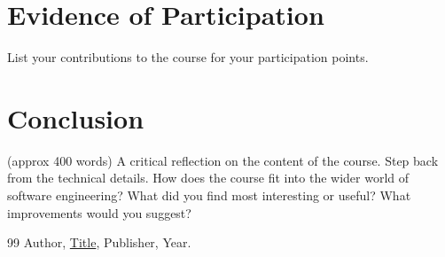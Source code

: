 \documentclass{article}
\theoremstyle{theorem}
\theoremstyle{definition}
\theoremstyle{remark}
\begin{document}
\section{Evidence of Participation}

List your contributions to the course for your participation points.

\section{Conclusion}\label{conclusion}

(approx 400 words) A critical reflection on the content of the course. Step back from the technical details. How does the course fit into the wider world of software engineering? What did you find most interesting or useful? What improvements would you suggest?

\begin{thebibliography}{99}
 Author, \href{https://en.wikipedia.org/wiki/LaTeX}{Title}, Publisher, Year.
\end{thebibliography}
\end{document}
